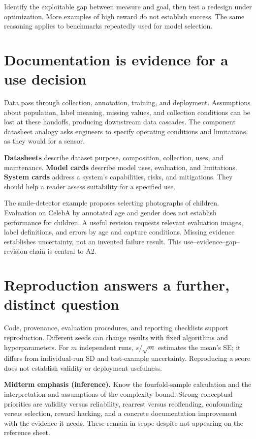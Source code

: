 \documentclass[11pt,letterpaper]{article}
\begin{document}
Identify the exploitable gap between measure and goal, then test a redesign under
optimization. More examples of high reward do not establish success. The same
reasoning applies to benchmarks repeatedly used for model selection.

\section*{Documentation is evidence for a use decision}
Data pass through collection, annotation, training, and deployment. Assumptions
about population, label meaning, missing values, and collection conditions can
be lost at these handoffs, producing downstream data cascades. The component
datasheet analogy asks engineers to specify operating conditions and limitations,
as they would for a sensor.

\textbf{Datasheets} describe dataset purpose, composition, collection, uses, and
maintenance. \textbf{Model cards} describe model uses, evaluation, and limitations.
\textbf{System cards} address a system's capabilities, risks, and mitigations.
They should help a reader assess suitability for a specified use.

The smile-detector example proposes selecting photographs of children. Evaluation
on CelebA by annotated age and gender does not establish performance for children.
A useful revision requests relevant evaluation images, label definitions, and errors
by age and capture conditions. Missing evidence establishes uncertainty, not an
invented failure result. This use--evidence--gap--revision chain is central to A2.

\section*{Reproduction answers a further, distinct question}
Code, provenance, evaluation procedures, and reporting checklists support
reproduction. Different seeds can change results with fixed algorithms and
hyperparameters. For $m$ independent runs, $s/\sqrt m$ estimates the mean's SE;
it differs from individual-run SD and test-example uncertainty. Reproducing a score
does not establish validity or deployment usefulness.

\textbf{Midterm emphasis (inference).} Know the fourfold-sample calculation and
the interpretation and assumptions of the complexity bound. Strong conceptual
priorities are validity versus reliability, rearrest versus reoffending, confounding
versus selection, reward hacking, and a concrete documentation improvement with
the evidence it needs. These remain in scope despite not appearing on the reference sheet.

\end{document}
